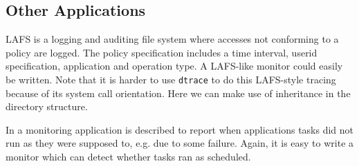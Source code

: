 \subsection{Other Applications}

LAFS \cite{lafs}
is a logging and auditing file system where accesses not conforming
to a policy are logged.
The policy specification
includes a time interval, userid specification, application
and operation type. A LAFS-like monitor could easily be written.
Note that it is harder to use {\tt dtrace} to do this LAFS-style tracing 
because of its system call orientation. Here we can make use of 
inheritance in the directory structure. 

In \cite{finke} a monitoring application is described to report when 
applications tasks did not run as they were supposed to, e.g. due to some
failure. Again, it is easy to write a monitor which can detect whether
tasks ran as scheduled.

